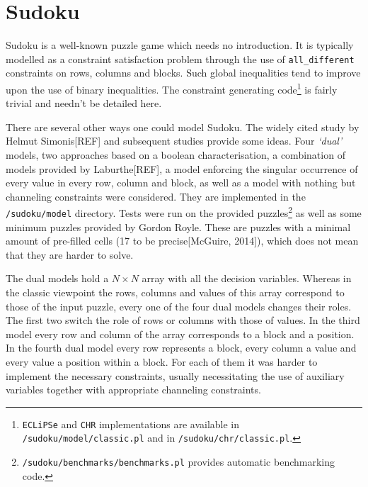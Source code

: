 \section{Sudoku}

Sudoku\cite{article:test} is a well-known puzzle game which needs no introduction. It is typically modelled as a constraint satisfaction problem through the use of \texttt{all\_different} constraints on rows, columns and blocks. Such global inequalities tend to improve upon the use of binary inequalities. The constraint generating code\footnote{\texttt{ECLiPSe} and \texttt{CHR} implementations are available in \texttt{/sudoku/model/classic.pl} and in \texttt{/sudoku/chr/classic.pl}.} is fairly trivial and needn't be detailed here. \\\par

There are several other ways one could model Sudoku. The widely cited study by Helmut Simonis[REF] and subsequent studies provide some ideas. Four \textit{`dual'} models, two approaches based on a boolean characterisation, a combination of models provided by Laburthe[REF], a model enforcing the singular occurrence of every value in every row, column and block, as well as a model with nothing but channeling constraints were considered. They are implemented in the \texttt{/sudoku/model} directory. Tests were run on the provided puzzles\footnote{\texttt{/sudoku/benchmarks/benchmarks.pl} provides automatic benchmarking code.} as well as some minimum puzzles provided by Gordon Royle. These are puzzles with a minimal amount of pre-filled cells (17 to be precise[McGuire, 2014]), which does not mean that they are harder to solve. \\\par

The dual models hold a $N\times N$ array with all the decision variables. Whereas in the classic viewpoint the rows, columns and values of this array correspond to those of the input puzzle, every one of the four dual models changes their roles. The first two switch the role of rows or columns with those of values. In the third model every row and column of the array corresponds to a block and a position. In the fourth dual model every row represents a block, every column a value and every value a position within a block. For each of them it was harder to implement the necessary constraints, usually necessitating the use of auxiliary variables together with appropriate channeling constraints.\\\par  

